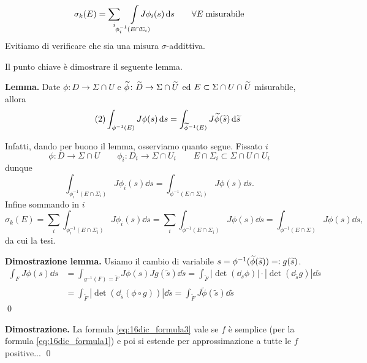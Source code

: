 
%
$$
	\sigma_k (E) = \sum_i \quad  \int\limits_{\mathclap{\phi_i^{-1}(E \cap \Sigma_i)}} J \phi_i(s) \dd s \qquad \forall E \; \text{misurabile}
$$
%
Evitiamo di verificare che sia una misura $\sigma$-addittiva.

\newpage

Il punto chiave è dimostrare il seguente lemma.

\textbf{Lemma.} Date $\phi \colon D \to \Sigma \cap U$ e $\widetilde{\phi} \colon \widetilde{D} \to \Sigma \cap \widetilde{U}$ ed $E \subset \Sigma \cap U \cap \widetilde{U}$ misurabile, allora
%
\begin{equation}
	\label{eq:16dic_formula2} \tag{2}
	\int_{\phi^{-1}(E)} J\phi(s) \,\mathrm{d} s = \int_{\widetilde{\phi}^{-1}(E)} J\widetilde{\phi}(\widetilde{s}) \,\mathrm{d} \widetilde{s}
\end{equation}
%

Infatti, dando per buono il lemma, osserviamo quanto segue.
Fissato $i$
$$
	\phi \colon D \to \Sigma \cap U \qquad \phi_i \colon D_i \to \Sigma \cap U_i
	\qquad E \cap \Sigma_i \subset \Sigma \cap U \cap U_i
$$
dunque
$$
	\int_{\phi_i^{-1}(E \cap \Sigma_i)} J \phi_i(s) \dd s
	= \int_{\phi^{-1}(E \cap \Sigma_i)} J \phi(s) \dd s.
$$
Infine sommando in $i$
$$
	\sigma_k(E)
	= \sum_i \int_{\phi_i^{-1}(E \cap \Sigma_i)} J \phi_i(s) \dd s 
	= \sum_i \int_{\phi^{-1}(E \cap \Sigma_i)} J \phi(s) \dd s 
	= \int_{\phi^{-1}(E \cap \Sigma)} J \phi(s) \dd s,
$$
da cui la tesi.

\textbf{Dimostrazione lemma.} Usiamo il cambio di variabile $s = \phi^{-1}(\widetilde{\phi}(\widetilde{s})) =: g(\widetilde{s})$.
\begin{align*}
	\int_F J\phi(s) \dd s & = \int_{g^{-1}(F) = \tilde{F}} J\phi(s) Jg(\tilde{s}) \dd \tilde{s}
	= \int_{\tilde{F}} |\det(\dd_s \phi)| \cdot | \det(\dd_{\tilde{s}}g)| \dd \tilde{s} \\
	& = \int_{\tilde{F}} \left| \det (\dd_{\tilde{s}}(\phi \circ g)) \right| \dd \tilde{s}
	= \int_{\tilde{F}} J \tilde{\phi}(\tilde{s}) \dd \tilde{s}
\end{align*}
%
\qed

\textbf{Dimostrazione.} La formula \eqref{eq:16dic_formula3} vale se $f$ è semplice (per la formula \eqref{eq:16dic_formula1}) e poi si estende per approssimazione a tutte le $f$ positive...
\qed

